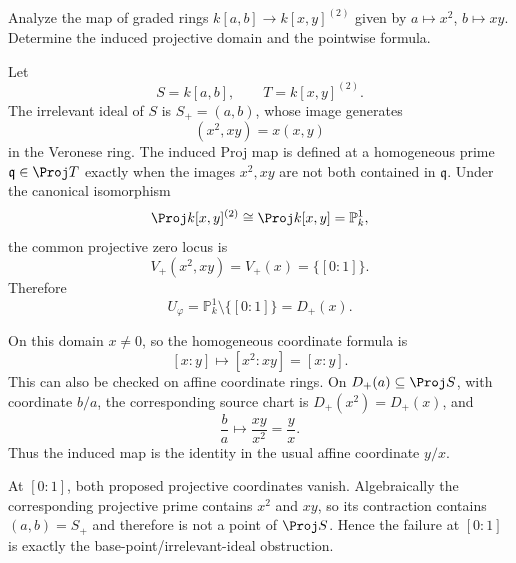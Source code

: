 \begin{problem}\label{prob:vi38-02}
Analyze the map of graded rings \(k[a,b]\to k[x,y]^{(2)}\) given by \(a\mapsto x^2\), \(b\mapsto xy\).  Determine the induced projective domain and the pointwise formula.
\end{problem}

\ifdefined\FullProblemDossiers
\begin{solution}
Let
\[
S=k[a,b],\qquad T=k[x,y]^{(2)}.
\]
The irrelevant ideal of \(S\) is \(S_+=(a,b)\), whose image generates
\[
(x^2,xy)=x(x,y)
\]
in the Veronese ring.  The induced Proj map is defined at a homogeneous prime
\(\mathfrak q\in\Proj T\) exactly when the images \(x^2,xy\) are not both contained
in \(\mathfrak q\).  Under the canonical isomorphism
\[
\Proj k[x,y]^{(2)}\cong\Proj k[x,y]=\mathbb P^1_k,
\]
the common projective zero locus is
\[
V_+(x^2,xy)=V_+(x)=\{[0:1]\}.
\]
Therefore
\[
\boxed{U_\varphi=\mathbb P^1_k\setminus\{[0:1]\}=D_+(x)}.
\]

On this domain \(x\neq0\), so the homogeneous coordinate formula is
\[
[x:y]\longmapsto[x^2:xy]=[x:y].
\]
This can also be checked on affine coordinate rings.  On \(D_+(a)\subseteq\Proj S\),
with coordinate \(b/a\), the corresponding source chart is \(D_+(x^2)=D_+(x)\), and
\[
\frac ba\longmapsto\frac{xy}{x^2}=\frac yx.
\]
Thus the induced map is the identity in the usual affine coordinate \(y/x\).

At \([0:1]\), both proposed projective coordinates vanish. Algebraically the
corresponding projective prime contains \(x^2\) and \(xy\), so its contraction
contains \((a,b)=S_+\) and therefore is not a point of \(\Proj S\).  Hence the
failure at \([0:1]\) is exactly the base-point/irrelevant-ideal obstruction.
\end{solution}
\fi
